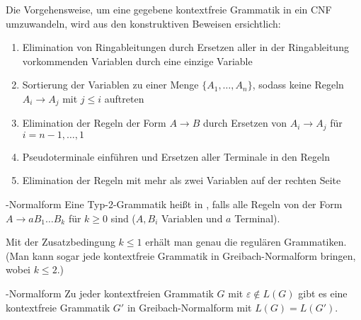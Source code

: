 \begin{Bem}
    Die Vorgehensweise, um eine gegebene kontextfreie Grammatik in ein
    CNF umzuwandeln, wird aus den konstruktiven Beweisen ersichtlich:
    \begin{enumerate}
        \item
        Elimination von Ringableitungen durch Ersetzen aller in der
        Ringableitung vorkommenden Variablen durch eine einzige Variable

        \item
        Sortierung der Variablen zu einer Menge $\{A_1, \dotsc, A_n\}$,
        sodass keine Regeln $A_i \rightarrow A_j$ mit $j \le i$ auftreten

        \item
        Elimination der Regeln der Form $A \rightarrow B$
        durch Ersetzen von $A_i \rightarrow A_j$ für $i = n - 1, \dotsc, 1$

        \item
        Pseudoterminale einführen und Ersetzen aller Terminale in den Regeln

        \item
        Elimination der
        Regeln mit mehr als zwei Variablen auf der rechten Seite
    \end{enumerate}
\end{Bem}

\linie

\begin{Def}{-Normalform}
    Eine Typ-2-Grammatik heißt in , falls
    alle Regeln von der Form $A \rightarrow a B_1 \dotsc B_k$ für $k \ge 0$
    sind ($A, B_i$ Variablen und $a$ Terminal).
\end{Def}

\begin{Bem}
    Mit der Zusatzbedingung $k \le 1$ erhält man genau die regulären
    Grammatiken.\\
    (Man kann sogar jede kontextfreie Grammatik in Greibach-Normalform bringen,
    wobei $k \le 2$.)
\end{Bem}

\begin{Satz}{-Normalform}
    Zu jeder kontextfreien Grammatik $G$ mit $\varepsilon \notin L(G)$ gibt
    es eine kontextfreie Grammatik $G'$ in Greibach-Normalform mit
    $L(G) = L(G')$.
\end{Satz}

